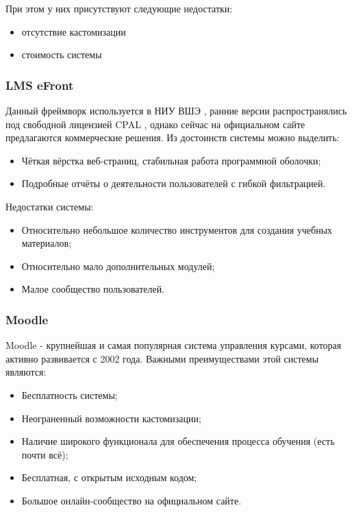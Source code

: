 \documentclass[a4paper,14pt]{article}
\begin{document}
При этом у них присутствуют следующие недостатки:
\begin{itemize}
	\item отсутствие кастомизации
	\item стоимость системы
\end{itemize} 

\subsubsection{LMS eFront}

Данный фреймворк используется в НИУ ВШЭ \cite{eFont}, ранние версии распространялись под свободной лицензией CPAL \cite{eFontWiki}, однако сейчас на официальном сайте предлагаются коммерческие решения.
Из достоинств системы можно выделить:

\begin{itemize}
	\item Чёткая вёрстка веб-страниц, стабильная работа программной оболочки;
	\item Подробные отчёты о деятельности пользователей с гибкой фильтрацией.	
\end{itemize} 

Недостатки системы:

\begin{itemize}
	\item Относительно небольшое количество инструментов для создания учебных материалов;
	\item Относительно мало дополнительных модулей;
	\item Малое сообщество пользователей.
\end{itemize} 

\subsubsection{Moodle}

Moodle - крупнейшая и самая популярная система управления курсами, которая активно развивается с 2002 года.
Важными преимуществами этой системы являются:

\begin{itemize}
	\item Бесплатность системы;
	\item Неограненный возможности кастомизации;
	\item Наличие широкого функционала для обеспечения процесса обучения (есть почти всё);
	\item Бесплатная, с открытым исходным кодом;
	\item Большое онлайн-сообщество на официальном сайте.
\end{itemize} 
\end{document}
